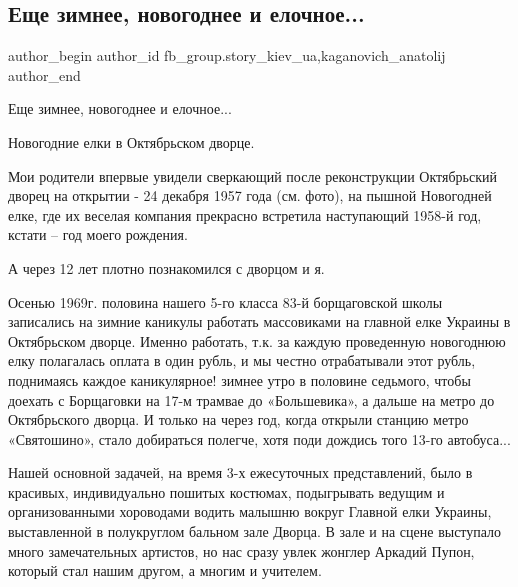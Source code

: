  
 
 
 
 
 
\subsection{Еще зимнее, новогоднее и елочное...}
\label{sec:01_01_2022.fb.fb_group.story_kiev_ua.2.zimnee}
 
\ifcmt
 author_begin
   author_id fb_group.story_kiev_ua,kaganovich_anatolij
 author_end
\fi

Еще зимнее, новогоднее и елочное... 

Новогодние елки в Октябрьском дворце.

Мои родители впервые увидели сверкающий после реконструкции Октябрьский дворец
на открытии - 24 декабря 1957 года (см. фото), на пышной Новогодней елке, где
их веселая компания прекрасно встретила наступающий 1958-й год, кстати – год
моего рождения.

А через 12 лет плотно познакомился с дворцом и я.


Осенью 1969г. половина нашего 5-го класса 83-й борщаговской школы записались на
зимние каникулы работать массовиками на главной елке Украины в Октябрьском
дворце. Именно работать, т.к. за каждую проведенную новогоднюю елку полагалась
оплата в один рубль, и мы честно отрабатывали этот рубль, поднимаясь каждое
каникулярное! зимнее утро в половине седьмого, чтобы доехать с Борщаговки на
17-м трамвае до «Большевика», а дальше на метро до Октябрьского дворца. И
только на через год, когда открыли станцию метро «Святошино», стало добираться
полегче, хотя поди дождись того 13-го автобуса...


Нашей основной задачей, на время 3-х ежесуточных представлений, было в
красивых, индивидуально пошитых костюмах, подыгрывать ведущим и организованными
хороводами водить малышню вокруг Главной елки Украины, выставленной в
полукруглом бальном зале Дворца. В зале и на сцене выступало много
замечательных артистов, но нас сразу увлек жонглер Аркадий Пупон, который стал
нашим другом, а многим и учителем.

